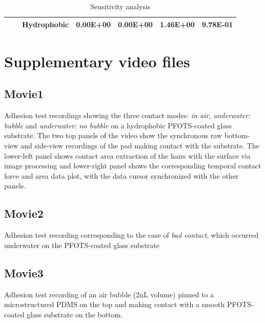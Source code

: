 \documentclass[english]{achemso}
\begin{document}
\begin{table}[H]
\begin{tabular}{|l|c|l|l|l|l|l|}
                                    &                                 & Hydrophobic                                              & 0.00E+00                                  & 0.00E+00                               & 1.46E+00                                  & 9.78E-01                               \\ \hline
\end{tabular}
\caption{Sensitivity analysis \label{tab:Sens-anal}}
\end{table}

\section{Supplementary video files}

\subsection*{Movie1}
Adhesion test recordings showing the three contact modes: \emph{in air},  \emph{underwater: bubble} and  \emph{underwater: no bubble} on a hydrophobic PFOTS-coated glass substrate. The two top panels of the video show the synchronous raw bottom-view and side-view recordings of the pad making contact with the substrate. The lower-left panel shows contact area extraction of the hairs with the surface via image processing and lower-right panel shows the corresponding temporal contact force and area data plot, with the data cursor synchronized with the other panels.

\subsection*{Movie2}
Adhesion test recording corresponding to the case of \emph{bad contact}, which occurred underwater on the PFOTS-coated glass substrate

\subsection*{Movie3}
Adhesion test recording of an air bubble (2nL volume) pinned to a microstructured PDMS on the top and making contact with a smooth PFOTS-coated glass substrate on the bottom.


\end{document}
